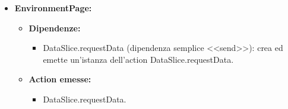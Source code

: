 \begin{itemize}
      \item \textbf{EnvironmentPage:}
            \begin{itemize}
                  \item \textbf{Dipendenze:}
                        \begin{itemize}
                              \item DataSlice.requestData (dipendenza semplice <<send>>): crea ed emette un'istanza
                                    dell'action DataSlice.requestData.
                        \end{itemize}
                  \item \textbf{Action emesse:}
                        \begin{itemize}
                              \item DataSlice.requestData.
                        \end{itemize}
            \end{itemize}
\end{itemize}

\pagebreak

